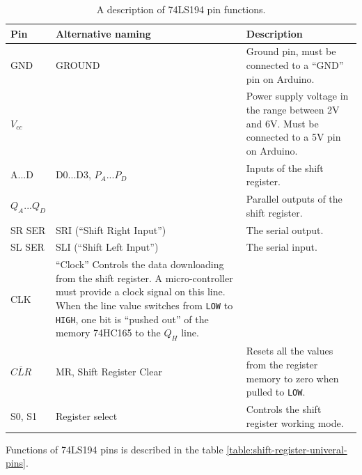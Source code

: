 \documentclass[../sparc.tex]{subfiles}
\begin{document}
\begin{table}[H]
  \centering
  \small
  \begin{tabular}{ | m{1.2cm} | m{2.55cm} | m{6.75cm} | }
    \hline
    \textbf{Pin}
    & \textbf{Alternative naming}
    & \textbf{Description} \\
    \hline
    GND
    & GROUND
    & Ground pin, must be connected to a ``GND'' pin on Arduino. \\
    \hline
    $V_{cc}$
    &
    & Power supply voltage in the range between 2V and 6V.
    Must be connected to a 5V pin on Arduino. \\
    \hline
    A...D
    & D0...D3, $P_{A}...P_{D}$
    & Inputs of the shift register. \\
    \hline
    $Q_{A}...Q_{D}$
    &
    & Parallel outputs of the shift register. \\
    \hline
    SR SER
    & SRI (``Shift Right Input'')
    & The serial output. \\
    \hline
    SL SER
    & SLI (``Shift Left Input'')
    & The serial input. \\
    \hline
    CLK
    & ``Clock''
    Controls the data downloading from the shift register.  A micro-controller
    must provide a clock signal on this line.  When the line value switches from
    \texttt{LOW} to \texttt{HIGH}, one bit is ``pushed out'' of the memory
    74HC165 to the $Q_H$ line. \\
    \hline
    $\overline{CLR}$
    & MR, Shift Register Clear
    & Resets all the values from the register memory to zero when pulled to
    \texttt{LOW}. \\
    \hline
    S0, S1
    &  Register select
    &  Controls the shift register working mode.\\
    \hline
  \end{tabular}
  \caption{A description of 74LS194 pin functions.}
  \label{table:shift-register-universal-pins}
\end{table}

Functions of 74LS194 pins is described in the table
\ref{table:shift-register-univeral-pins}.
\end{document}

